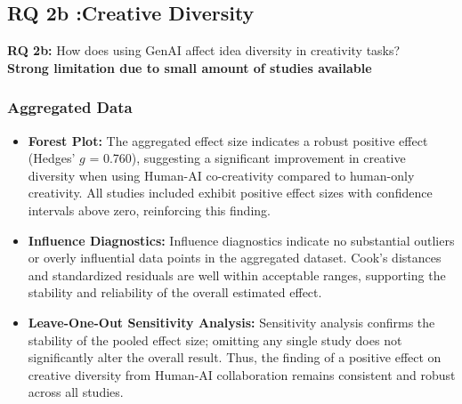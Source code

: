 \documentclass[manuscript, screen, review, acmsmall, anonymous]{acmart}
\begin{document}
\subsection{RQ 2b :Creative Diversity}
\label{sec:CreativeDiversity}

\textbf{RQ 2b:} How does using GenAI affect idea diversity in creativity tasks? \\

\textbf{Strong limitation due to small amount of studies available}
\subsubsection{Aggregated Data}
\begin{itemize}
  \item \textbf{Forest Plot:} The aggregated effect size indicates a robust positive effect (Hedges' $g$ = 0.760), suggesting a significant improvement in creative diversity when using Human-AI co-creativity compared to human-only creativity. All studies included exhibit positive effect sizes with confidence intervals above zero, reinforcing this finding.
  \item \textbf{Influence Diagnostics:} Influence diagnostics indicate no substantial outliers or overly influential data points in the aggregated dataset. Cook's distances and standardized residuals are well within acceptable ranges, supporting the stability and reliability of the overall estimated effect.
  \item \textbf{Leave-One-Out Sensitivity Analysis:} Sensitivity analysis confirms the stability of the pooled effect size; omitting any single study does not significantly alter the overall result. Thus, the finding of a positive effect on creative diversity from Human-AI collaboration remains consistent and robust across all studies.
\end{itemize}
\end{document}
